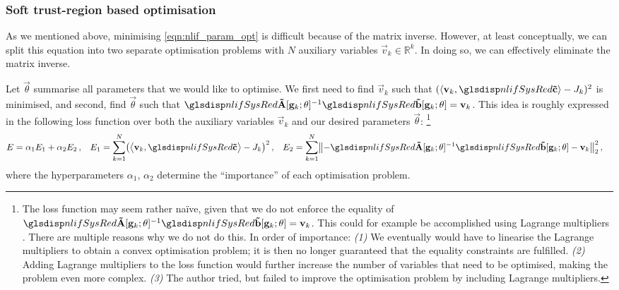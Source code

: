 \subsubsection{Soft trust-region based optimisation}
As we mentioned above, minimising \cref{eqn:nlif_param_opt} is difficult because of the matrix inverse.
However, at least conceptually, we can split this equation into two separate optimisation problems with $N$ auxiliary variables $\vec v_k \in \mathbb{R}^k$.
In doing so, we can effectively eliminate the matrix inverse.

Let $\vec \theta$ summarise all parameters that we would like to optimise.
We first need to find $\vec v_k$ such that $(\langle \vec v_k, \vrc \rangle - J_k)^2$ is minimised, and second, find $\vec \theta$ such that $\mrA[\vec g_k; \vec \theta]^{-1} \vrb[\vec g_k; \vec \theta] = \vec v_k$.
This idea is roughly expressed in the following loss function over both the auxiliary variables $\vec v_k$ and our desired parameters $\vec \theta$:%
\footnote{
The loss function may seem rather na\"ive, given that we do not enforce the equality of $\mrA[\vec g_k; \vec \theta]^{-1} \vrb[\vec g_k; \vec \theta] = \vec v_k$.
This could for example be accomplished using Lagrange multipliers \citep[e.g.,][Section~5.1]{boyd2004convex}.
There are multiple reasons why we do not do this. In order of importance:
\emph{(1)} We eventually would have to linearise the Lagrange multipliers to obtain a convex optimisation problem; it is then no longer guaranteed that the equality constraints are fulfilled.
\emph{(2)} Adding Lagrange multipliers to the loss function would further increase the number of variables that need to be optimised, making the problem even more complex.
\emph{(3)} The author tried, but failed to improve the optimisation problem by including Lagrange multipliers.
}%
\begin{align}
	E &= \alpha_1 E_1 + \alpha_2 E_2 \,, &
	E_1 &=  \sum_{k = 1}^N \bigl( \big\langle \vec v_k, \vrc \big\rangle - J_k \bigr)^2 \,, &
	E_2 &= \sum_{k = 1}^N \bigl\| -\mrA[\vec g_k; \vec \theta]^{-1} \vrb[\vec g_k; \vec \theta] - \vec v_k \bigr\|_2^2 \,,
\end{align}
where the hyperparameters $\alpha_1$, $\alpha_2$ determine the \enquote{importance} of each optimisation problem.

